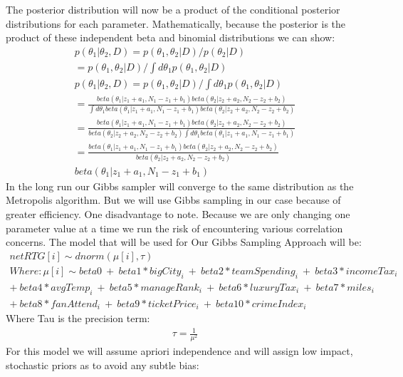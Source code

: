 \documentclass[12pt,english]{article}
\begin{document}
The posterior distribution will now be a product of the conditional posterior distributions for each parameter. Mathematically, because the posterior is the product of these independent beta and binomial distributions we can show:
\begin{align*}
    \label{eq:3}
   p(\theta_1|\theta_2,D) = p(\theta_1,\theta_2|D)/p(\theta_2|D)\\
    = p(\theta_1,\theta_2|D) / \int d\theta_1 p(\theta_1,\theta_2|D)\\
p(\theta_1|\theta_2,D) = p(\theta_1,\theta_2|D)/\int d\theta_1p(\theta_1,\theta_2|D)\\
= \frac{beta(\theta_1|z_1+a_1, N_1-z_1+b_1)beta(\theta_2|z_2+a_2,N_2-z_2+b_2)}
{\int d\theta_1 beta(\theta_1|z_1+a_1, N_1-z_1+b_1)beta(\theta_2|z_2+a_2,N_2-z_2+b_2)} \\
= \frac{beta(\theta_1|z_1+a_1, N_1-z_1+b_1)beta(\theta_2|z_2+a_2,N_2-z_2+b_2)}{beta(\theta_2|z_2+a_2, N_2-z_2+b_2) \int d\theta_1beta(\theta_1|z_1+a_1,N_1-z_1+b_1)} \\
= \frac{beta(\theta_1|z_1+a_1, N_1-z_1+b_1)beta(\theta_2|z_2+a_2,N_2-z_2+b_2)}{beta(\theta_2|z_2+a_2, N_2 - z_2 + b_2)} \\
beta(\theta_1|z_1+a_1, N_1 - z_1 +b_1)
\end{align*}
In the long run our Gibbs sampler will converge to the same distribution as the Metropolis algorithm. But we will use Gibbs sampling in our case because of greater efficiency. One disadvantage to note. Because we are only changing one parameter value at a time we run the risk of encountering various correlation concerns. 
The model that will be used for Our Gibbs Sampling Approach will be:
\begin{align*}
\label{eq:4}
netRTG[i] \sim dnorm(\mu[i], \tau)\\
Where: \mu[i] \sim beta0\ + \ beta1 * bigCity_{i}\ + \ beta2 * teamSpending_{i} \ + \ beta3 * incomeTax_{i} \\ + \ beta4 * avgTemp_{i} \ + \ beta5 * manageRank_{i}\ + \ beta6 * luxuryTax_{i} \ + \ beta7 * miles_{i} \\ + \ beta8 * fanAttend_{i}\ + \ beta9 * ticketPrice_{i} \ +  \ beta10 * crimeIndex_{i}
\end{align*}
Where Tau is the precision term:
\begin{align*}
\label{eq:5}
\tau = \frac{1}{\mu^{2}}
\end{align*}
For this model we will assume apriori independence and will assign low impact, stochastic priors as to avoid any subtle bias:
\end{document}
